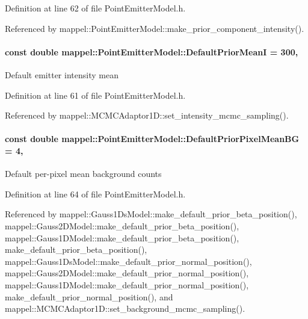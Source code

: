 Definition at line 62 of file Point\+Emitter\+Model.\+h.



Referenced by mappel\+::\+Point\+Emitter\+Model\+::make\+\_\+prior\+\_\+component\+\_\+intensity().

\paragraph[{\texorpdfstring{Default\+Prior\+MeanI}{DefaultPriorMeanI}}]{\setlength{\rightskip}{0pt plus 5cm}const double mappel\+::\+Point\+Emitter\+Model\+::\+Default\+Prior\+MeanI = 300\hspace{0.3cm}{\ttfamily [static]}, {\ttfamily [inherited]}}\hypertarget{classmappel_1_1PointEmitterModel_a607fcdea787b0cc3c6ac8804d378d1b1}{}\label{classmappel_1_1PointEmitterModel_a607fcdea787b0cc3c6ac8804d378d1b1}
Default emitter intensity mean 

Definition at line 61 of file Point\+Emitter\+Model.\+h.



Referenced by mappel\+::\+M\+C\+M\+C\+Adaptor1\+D\+::set\+\_\+intensity\+\_\+mcmc\+\_\+sampling().

\paragraph[{\texorpdfstring{Default\+Prior\+Pixel\+Mean\+BG}{DefaultPriorPixelMeanBG}}]{\setlength{\rightskip}{0pt plus 5cm}const double mappel\+::\+Point\+Emitter\+Model\+::\+Default\+Prior\+Pixel\+Mean\+BG = 4\hspace{0.3cm}{\ttfamily [static]}, {\ttfamily [inherited]}}\hypertarget{classmappel_1_1PointEmitterModel_a72efb3ee01fa548683d510288266fea5}{}\label{classmappel_1_1PointEmitterModel_a72efb3ee01fa548683d510288266fea5}
Default per-\/pixel mean background counts 

Definition at line 64 of file Point\+Emitter\+Model.\+h.



Referenced by mappel\+::\+Gauss1\+Ds\+Model\+::make\+\_\+default\+\_\+prior\+\_\+beta\+\_\+position(), mappel\+::\+Gauss2\+D\+Model\+::make\+\_\+default\+\_\+prior\+\_\+beta\+\_\+position(), mappel\+::\+Gauss1\+D\+Model\+::make\+\_\+default\+\_\+prior\+\_\+beta\+\_\+position(), make\+\_\+default\+\_\+prior\+\_\+beta\+\_\+position(), mappel\+::\+Gauss1\+Ds\+Model\+::make\+\_\+default\+\_\+prior\+\_\+normal\+\_\+position(), mappel\+::\+Gauss2\+D\+Model\+::make\+\_\+default\+\_\+prior\+\_\+normal\+\_\+position(), mappel\+::\+Gauss1\+D\+Model\+::make\+\_\+default\+\_\+prior\+\_\+normal\+\_\+position(), make\+\_\+default\+\_\+prior\+\_\+normal\+\_\+position(), and mappel\+::\+M\+C\+M\+C\+Adaptor1\+D\+::set\+\_\+background\+\_\+mcmc\+\_\+sampling().

